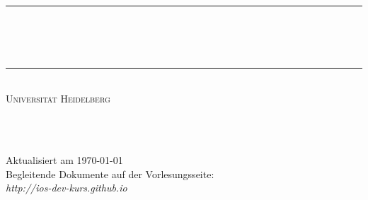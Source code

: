 \begin{titlepage}

\begin{center}

\makeatletter

\newcommand{\HRule}{\rule{\linewidth}{0.5mm}}
\HRule \\[0.4cm]
{\huge \bfseries \@title}\\[0.4cm]
\textsc{\Large \@subtitle}\\[0.4cm]
\HRule \\[1.5cm]

\textsc{
{\LARGE Universität Heidelberg}\\[0.4cm]
{\Large \semester}
}\\[1.5cm]


\vfill


\textsc{\Large \@author\\[1.5cm]}

\begin{minipage}{\textwidth}
\begin{flushleft} \large
{\large
Aktualisiert am \today\\
Begleitende Dokumente auf der Vorlesungsseite:\\
\emph{http://ios-dev-kurs.github.io}
}
\end{flushleft}
\end{minipage}


\makeatother

\end{center}

\end{titlepage}
